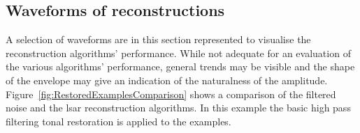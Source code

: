 %

\subsection{Waveforms of reconstructions}
A selection of waveforms are in this section represented to visualise the reconstruction algorithms' performance. While not adequate for an evaluation of the various algorithms' performance, general trends may be visible and the shape of the envelope may give an indication of the naturalness of the amplitude. Figure~\ref{fig:RestoredExamplesComparison} shows a comparison of the filtered noise and the \gls{lsar} reconstruction algorithms. In this example the basic high pass filtering tonal restoration is applied to the examples.


